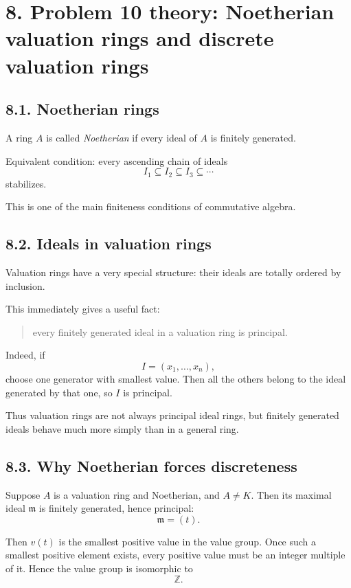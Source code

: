 \documentclass[12pt,a4paper]{article}
\theoremstyle{plain}
\theoremstyle{definition}      %
\begin{document}
\bigskip

\section*{8. Problem 10 theory: Noetherian valuation rings and discrete valuation rings}

\subsection*{8.1. Noetherian rings}

A ring \(A\) is called \emph{Noetherian} if every ideal of \(A\) is finitely generated.

Equivalent condition:
every ascending chain of ideals
\[
I_1\subseteq I_2\subseteq I_3\subseteq \cdots
\]
stabilizes.

This is one of the main finiteness conditions of commutative algebra.

\subsection*{8.2. Ideals in valuation rings}

Valuation rings have a very special structure: their ideals are totally ordered by inclusion.

This immediately gives a useful fact:
\begin{quote}
	every finitely generated ideal in a valuation ring is principal.
\end{quote}

Indeed, if
\[
I=(x_1,\dots,x_n),
\]
choose one generator with smallest value. Then all the others belong to the ideal generated by that one, so \(I\) is principal.

Thus valuation rings are not always principal ideal rings, but finitely generated ideals behave much more simply than in a general ring.

\subsection*{8.3. Why Noetherian forces discreteness}

Suppose \(A\) is a valuation ring and Noetherian, and \(A\neq K\). Then its maximal ideal \(\mathfrak m\) is finitely generated, hence principal:
\[
\mathfrak m=(t).
\]

Then \(v(t)\) is the smallest positive value in the value group. Once such a smallest positive element exists, every positive value must be an integer multiple of it. Hence the value group is isomorphic to
\[
\mathbb{Z}.
\]
\end{document}

